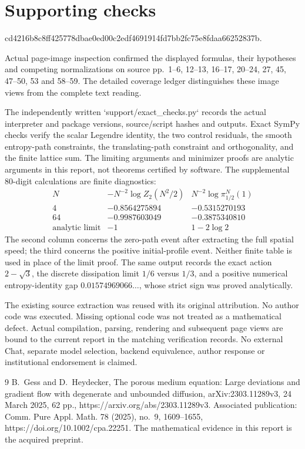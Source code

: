 \documentclass[10pt]{article}
\begin{document}
\section*{Supporting checks}
cd4216b8c8ff425778dbae0ed00c2edf4691914fd7bb2fc75e8fdaa66252837b.\par
Actual page-image inspection confirmed the displayed formulas, their hypotheses and competing normalizations on source pp. 1–6, 12–13, 16–17, 20–24, 27, 45, 47–50, 53 and 58–59. The detailed coverage ledger distinguishes these image views from the complete text reading.\par
The independently written `support/exact\_checks.py` records the actual interpreter and package versions, source/script hashes and outputs. Exact SymPy checks verify the scalar Legendre identity, the two control residuals, the smooth entropy-path constraints, the translating-path constraint and orthogonality, and the finite lattice sum. The limiting arguments and minimizer proofs are analytic arguments in this report, not theorems certified by software. The supplemental 80-digit calculations are finite diagnostics: \[\begin{array}{c|cc}
N & -N^{-2}\log Z_2(N^2/2) &
 N^{-2}\log\pi_{1/2}^N(1)\\
\hline
4&-0.8564275894&-0.5315270193\\
64&-0.9987603049&-0.3875340810\\
\text{analytic limit}&-1&1-2\log2
\end{array}\] The second column concerns the zero-path event after extracting the full spatial speed; the third concerns the positive initial-profile event. Neither finite table is used in place of the limit proof. The same output records the exact action \(2-\sqrt3\), the discrete dissipation limit \(1/6\) versus \(1/3\), and a positive numerical entropy-identity gap \(0.01574969066\ldots\), whose strict sign was proved analytically.\par
The existing source extraction was reused with its original attribution. No author code was executed. Missing optional code was not treated as a mathematical defect. Actual compilation, parsing, rendering and subsequent page views are bound to the current report in the matching verification records. No external Chat, separate model selection, backend equivalence, author response or institutional endorsement is claimed.\par
9 B. Gess and D. Heydecker, The porous medium equation: Large deviations and gradient flow with degenerate and unbounded diffusion, arXiv:2303.11289v3, 24 March 2025, 62 pp., https://arxiv.org/abs/2303.11289v3. Associated publication: Comm. Pure Appl. Math. 78 (2025), no. 9, 1609–1655, https://doi.org/10.1002/cpa.22251. The mathematical evidence in this report is the acquired preprint.\par
\end{document}
